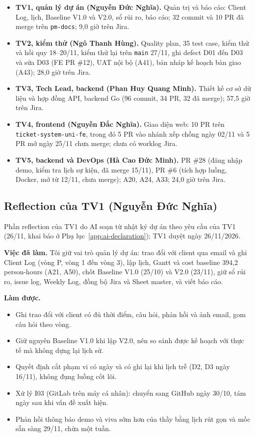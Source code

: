 \begin{itemize}
  \item \textbf{TV1, quản lý dự án (Nguyễn Đức Nghĩa).} Quản trị và báo cáo: Client Log, lịch, Baseline V1.0 và V2.0, sổ rủi ro, báo cáo; 32 commit và 10 PR đã merge trên \texttt{pm-docs}; 9,0 giờ trên Jira.
  \item \textbf{TV2, kiểm thử (Ngô Thanh Hùng).} Quality plan, 35 test case, kiểm thử và hồi quy 18--20/11, kiểm thử lại trên \texttt{main} 27/11, ghi defect D01 đến D03 và sửa D03 (FE PR \#12), UAT nội bộ (A41), bản nháp kế hoạch bàn giao (A43); 28,0 giờ trên Jira.
  \item \textbf{TV3, Tech Lead, backend (Phan Huy Quang Minh).} Thiết kế cơ sở dữ liệu và hợp đồng API, backend Go (96 commit, 34 PR, 32 đã merge); 57,5 giờ trên Jira.
  \item \textbf{TV4, frontend (Nguyễn Đắc Nghĩa).} Giao diện web: 10 PR trên \texttt{ticket-system-uni-fe}, trong đó 5 PR vào nhánh xếp chồng ngày 02/11 và 5 PR mở ngày 25/11 chưa merge; chưa có worklog Jira.
  \item \textbf{TV5, backend và DevOps (Hà Cao Đức Minh).} PR \#28 (đăng nhập demo, kiểm tra lịch sự kiện, đã merge 15/11), PR \#6 (tích hợp luồng, Docker, mở từ 12/11, chưa merge); A20, A24, A33; 24,0 giờ trên Jira.
\end{itemize}

\subsection*{Reflection của TV1 (Nguyễn Đức Nghĩa)}

Phần reflection của TV1 do AI soạn từ nhật ký dự án theo yêu cầu của TV1 (26/11, khai báo ở Phụ lục~\ref{app:ai-declaration}); TV1 duyệt ngày 26/11/2026.

\textbf{Việc đã làm.} Tôi giữ vai trò quản lý dự án: trao đổi với client qua email và ghi Client Log (vòng P, vòng 1 đến vòng 3), lập lịch, Gantt và cost baseline 394,2 person-hours (A21, A50), chốt Baseline V1.0 (25/10) và V2.0 (23/11), giữ sổ rủi ro, issue log, Weekly Log, đồng bộ Jira và Sheet master, và viết báo cáo.

\textbf{Làm được.}
\begin{itemize}
  \item Ghi trao đổi với client có đủ thời điểm, câu hỏi, phản hồi và ảnh email, gom câu hỏi theo vòng.
  \item Giữ nguyên Baseline V1.0 khi lập V2.0, nên so sánh được kế hoạch với thực tế mà không dựng lại lịch sử.
  \item Quyết định cắt phạm vi có ngày và có ghi lại khi lịch trễ (D2, D3 ngày 16/11), không đụng luồng cốt lõi.
  \item Xử lý I03 (GitLab trên máy cá nhân): chuyển sang GitHub ngày 30/10, tám ngày sau khi vấn đề xuất hiện.
  \item Phản hồi thông báo demo và viva sớm hơn của thầy bằng lịch rút gọn và mốc sẵn sàng 29/11, chừa một tuần.
\end{itemize}

